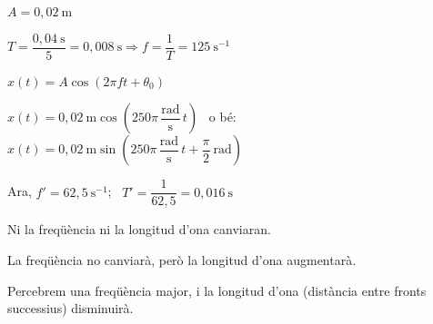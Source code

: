 \begin{solapartat}
 $A = 0,02\ \mathrm{m}$

\smallskip
{} $T = \dfrac{0,04\ \mathrm{s}}{5} = 0,008\ \mathrm{s} \Rightarrow f = \dfrac{1}{T} = 125\ \mathrm{s^{-1}}$

\smallskip
{} $x(t) = A\cos(2\pi f t + \theta_0)$

\smallskip
{} $x(t) = 0,02\ \mathrm{m}\cos\left(250\pi\,\dfrac{\mathrm{rad}}{\mathrm{s}}\,t\right)$ \ o bé: \ $x(t) = 0,02\ \mathrm{m}\sin\left(250\pi\,\dfrac{\mathrm{rad}}{\mathrm{s}}\,t + \dfrac{\pi}{2}\ \mathrm{rad}\right)$

\smallskip
{}

 Ara, $f' = 62,5\ \mathrm{s^{-1}}$; \ $T' = \dfrac{1}{62,5} = 0,016\ \mathrm{s}$
\end{solapartat}

\begin{solapartat}
\begin{description}[leftmargin=4.5em, labelwidth=4em, labelsep=0.5em, itemsep=2pt]
  \item[\punts{0,3}b1)] Ni la freqüència ni la longitud d'ona canviaran.
  \item[\punts{0,3}b2)] La freqüència no canviarà, però la longitud d'ona augmentarà.
  \item[\punts{0,4}b3)] Percebrem una freqüència major, i la longitud d'ona (distància entre fronts successius) disminuirà.
\end{description}
\end{solapartat}
